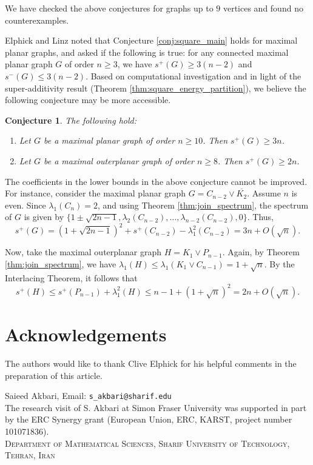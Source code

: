 \documentclass{article}
\newtheorem{conjecture}{Conjecture}[section]
\begin{document}
We have checked the above conjectures for graphs up to $9$ vertices and found no counterexamples. 

Elphick and Linz \cite{Elphick_Linz_2024} noted that Conjecture \ref{conj:square_main} holds for maximal planar graphs, and asked if the following is true: for any connected maximal planar graph $G$ of order $n \ge 3$, we have $s^+(G)\ge 3(n-2)$ and $s^-(G) \le 3(n-2)$. Based on computational investigation and in light of the super-additivity result (Theorem \ref{thm:square_energy_partition}), we believe the following conjecture may be more accessible.

\begin{conjecture} The following hold:
\begin{enumerate}[$(i)$]
    \item Let $G$ be a maximal planar graph of order $n\ge 10$. Then $s^+(G)\ge 3n$.
    \item Let $G$ be a maximal outerplanar graph of order $n\ge 8$. Then $s^+(G)\ge 2n$. 
\end{enumerate} 
\end{conjecture}

The coefficients in the lower bounds in the above conjecture cannot be improved. For instance, consider the maximal planar graph $G = C_{n-2} \vee \overline{K_2}$. Assume $n$ is even. Since $\lambda_1(C_n)=2$, and using Theorem \ref{thm:join_spectrum}, the spectrum of $G$ is given by $\{1 \pm \sqrt{2n-1},  \lambda_2(C_{n-2}), \ldots, \lambda_{n-2}(C_{n-2}), 0 \}$. Thus, 
\[ s^+(G) = (1 + \sqrt{2n-1})^2 + s^+(C_{n-2}) - \lambda_1^2(C_{n-2})=3n + O(\sqrt{n}).\]

Now, take the maximal outerplanar graph $H=K_1 \vee P_{n-1}$. Again, by Theorem \ref{thm:join_spectrum}, we have $\lambda_1(H) \le \lambda_1(K_1\vee C_{n-1})= 1 + \sqrt{n}$. By the Interlacing Theorem, it follows that 
\[ s^+(H) \le s^+(P_{n-1}) + \lambda_1^2(H) \le n-1 + (1+\sqrt{n})^2 = 2n + O(\sqrt{n}).\]

\section*{Acknowledgements}
The authors would like to thank Clive Elphick for his helpful comments in the preparation of this article. 




\vspace{0.3cm}
\noindent Saieed Akbari, Email: {\tt s\_akbari@sharif.edu}\\ 
The research visit of S. Akbari at Simon Fraser University was supported in part by the ERC Synergy grant (European Union, ERC, KARST, project number 101071836).\\
\textsc{Department of Mathematical Sciences, Sharif University of Technology, Tehran, Iran}\\[1pt]
\end{document}
